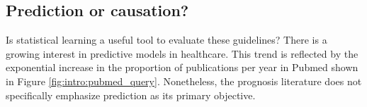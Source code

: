 \documentclass[french,12pt,twoside,a4paper]{book}
\begin{document}
\begin{background_box_left}

  \subsection{Prediction or causation?}%
  \label{subsec:intro:prediction_causation}%

  Is statistical learning a useful tool to evaluate these guidelines? There is a
  growing interest in predictive models in healthcare. This trend is reflected
  by the exponential increase in the proportion of publications per year in
  Pubmed shown in Figure \ref{fig:intro:pubmed_query}. Nonetheless, the
  prognosis literature does not specifically emphasize prediction as its primary
  objective.



\end{background_box_left}
\end{document}
